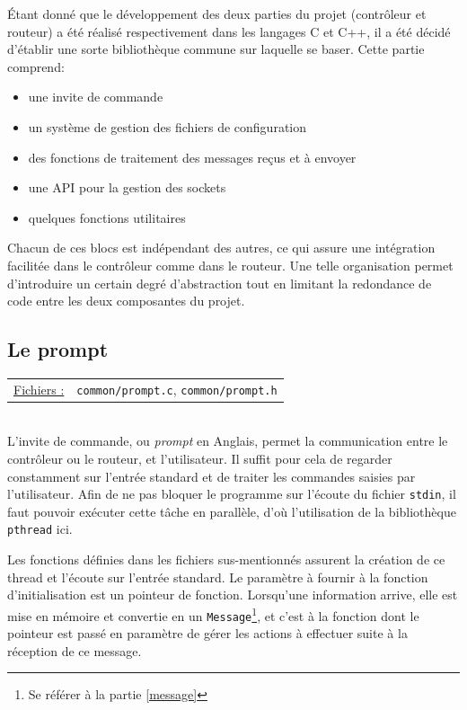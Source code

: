 \documentclass[a4paper,11pt]{article}
\begin{document}
Étant donné que le développement des deux parties du projet (contrôleur et routeur) a été réalisé respectivement dans les langages C et C++, il a été décidé d'établir une sorte bibliothèque commune sur laquelle se baser. Cette partie comprend:
\begin{itemize}
 \item une invite de commande
 \item un système de gestion des fichiers de configuration
 \item des fonctions de traitement des messages reçus et à envoyer
 \item une API pour la gestion des sockets
 \item quelques fonctions utilitaires
\end{itemize}

Chacun de ces blocs est indépendant des autres, ce qui assure une intégration facilitée dans le contrôleur comme dans le routeur. Une telle organisation permet d'introduire un certain degré d'abstraction tout en limitant la redondance 
de code entre les deux composantes du projet.

\subsection{Le prompt}

\begin{tabularx}{\linewidth}{lX}
\underline{Fichiers :} & \texttt{common/prompt.c}, \texttt{common/prompt.h}
\end{tabularx}\\

L'invite de commande, ou \textit{prompt} en Anglais, permet la communication entre le contrôleur ou le routeur, et l'utilisateur. Il suffit pour cela de regarder constamment sur l'entrée standard et de traiter les commandes saisies par l'utilisateur. Afin de ne pas bloquer le programme sur l'écoute du fichier \texttt{stdin}, il faut pouvoir exécuter cette tâche en parallèle, d'où l'utilisation de la bibliothèque \texttt{pthread} ici.

Les fonctions définies dans les fichiers sus-mentionnés assurent la création de ce thread et l'écoute sur l'entrée standard. Le paramètre à fournir à la fonction d'initialisation est un pointeur de fonction. Lorsqu'une information arrive, elle est mise en mémoire et convertie en un \texttt{Message}\footnote{Se référer à la partie \ref{message}}, et c'est à la fonction dont le pointeur est passé en paramètre de gérer les actions à effectuer suite à la réception de ce message.
\end{document}
